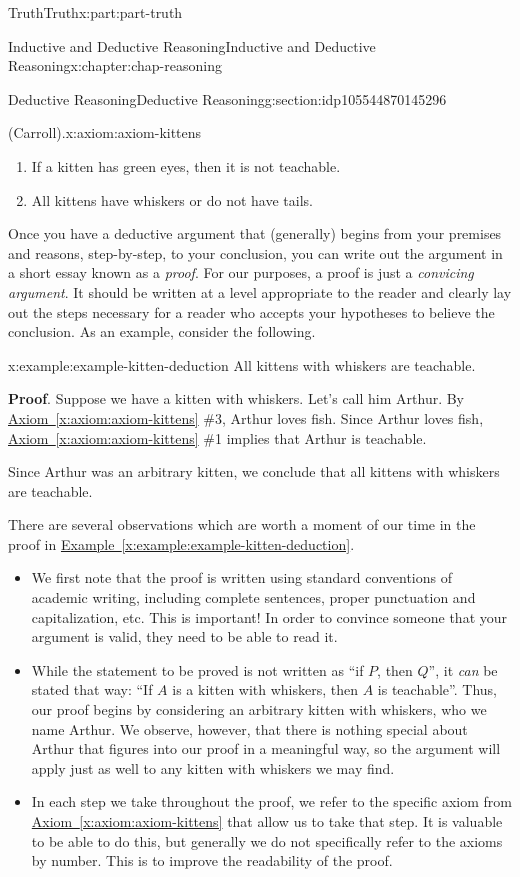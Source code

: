 \documentclass[oneside,10pt,]{book}
\newcommand{\xreffont}{\relax}
\newcommand{\terminology}[1]{\textbf{#1}}
\numberwithin{equation}{section}
\begin{document}
\begin{partptx}{Truth}{}{Truth}{}{}{x:part:part-truth}
\begin{chapterptx}{Inductive and Deductive Reasoning}{}{Inductive and Deductive Reasoning}{}{}{x:chapter:chap-reasoning}
\begin{sectionptx}{Deductive Reasoning}{}{Deductive Reasoning}{}{}{g:section:idp105544870145296}
\begin{axiom}{(Carroll).}{}{x:axiom:axiom-kittens}
\begin{enumerate}
\item{}If a kitten has green eyes, then it is not teachable.%
\item{}All kittens have whiskers or do not have tails.%
\end{enumerate}
\end{axiom}
Once you have a deductive argument that (generally) begins from your premises and reasons, step-by-step, to your conclusion, you can write out the argument in a short essay known as a \emph{proof}. For our purposes, a proof is just a \emph{convicing argument}. It should be written at a level appropriate to the reader and clearly lay out the steps necessary for a reader who accepts your hypotheses to believe the conclusion. As an example, consider the following.%
\begin{example}{}{x:example:example-kitten-deduction}%
All kittens with whiskers are teachable.%
\par
\terminology{Proof}. Suppose we have a kitten with whiskers. Let's call him Arthur. By \hyperref[x:axiom:axiom-kittens]{Axiom~{\xreffont\ref{x:axiom:axiom-kittens}}} \#3, Arthur loves fish. Since Arthur loves fish, \hyperref[x:axiom:axiom-kittens]{Axiom~{\xreffont\ref{x:axiom:axiom-kittens}}} \#1 implies that Arthur is teachable.%
\par
Since Arthur was an arbitrary kitten, we conclude that all kittens with whiskers are teachable.%
\end{example}
There are several observations which are worth a moment of our time in the proof in \hyperref[x:example:example-kitten-deduction]{Example~{\xreffont\ref{x:example:example-kitten-deduction}}}.%
%
\begin{itemize}[label=\textbullet]
\item{}We first note that the proof is written using standard conventions of academic writing, including complete sentences, proper punctuation and capitalization, etc. This is important! In order to convince someone that your argument is valid, they need to be able to read it.%
\item{}While the statement to be proved is not written as ``if \(P\), then \(Q\)'', it \emph{can} be stated that way: ``If \(A\) is a kitten with whiskers, then \(A\) is teachable''. Thus, our proof begins by considering an arbitrary kitten with whiskers, who we name Arthur. We observe, however, that there is nothing special about Arthur that figures into our proof in a meaningful way, so the argument will apply just as well to any kitten with whiskers we may find.%
\item{}In each step we take throughout the proof, we refer to the specific axiom from \hyperref[x:axiom:axiom-kittens]{Axiom~{\xreffont\ref{x:axiom:axiom-kittens}}} that allow us to take that step. It is valuable to be able to do this, but generally we do not specifically refer to the axioms by number. This is to improve the readability of the proof.%

\end{itemize}
\end{sectionptx}
\end{chapterptx}
\end{partptx}
\end{document}
